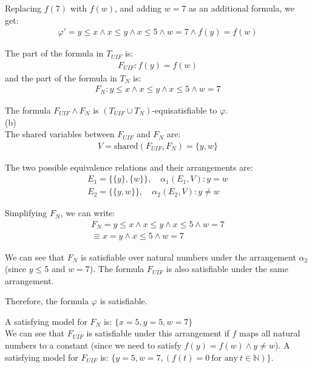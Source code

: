\documentclass[12pt,letterpaper, onecolumn]{exam}
\begin{document}
\begin{questions}
	Replacing $ f(7) $ with $ f(w) $, and adding $ w= 7 $ as an additional formula, we get:
	\begin{align*}
		\varphi' = y \le x \land x \le y \land x \le 5 \land w = 7 \land f(y) = f(w) 
	\end{align*} 

	The part of the formula in $ T_{UIF} $ is:
	\begin{align*}
		F_{UIF} : f(y) = f(w)
	\end{align*}
	and the part of the formula in $ T_{N} $ is:
	\begin{align*}
		F_{N} : y \le x \land x \le y \land x \le 5 \land w = 7
	\end{align*}

	The formula $ F_{UIF} \land F_{N} $ is $(T_{UIF} \cup T_N)$-equisatisfiable to $ \varphi $. \\

	(b) \\
	The shared variables between $ F_{UIF} $ and $ F_{N} $ are:
	\begin{align*}
		V = \text{shared}(F_{UIF}, F_{N}) = \{y, w\}
	\end{align*}

	The two possible equivalence relations and their arrangements are:
	\begin{align*}
		E_1 = \{\{y\}, \{w\}\}, \quad \alpha_1(E_1, V) : y = w\\
		E_2 = \{\{y, w\}\}, \quad \alpha_2(E_2, V) : y \neq w
	\end{align*}

	Simplifying $F_N$, we can write:
	\begin{align*}
		F_N = y \le x \land x \le y \land x \le 5 \land w = 7 \\
			\equiv x = y \land x \le 5 \land w = 7
	\end{align*}

	We can see that $F_N$ is satisfiable over natural numbers under the arrangement $\alpha_2$ (since $y \le 5$ and $w=7$).
	The formula $F_{UIF}$ is also satisfiable under the same arrangement.

	Therefore, the formula $ \varphi $ is satisfiable.

	A satisfying model for $F_N$ is:  $ \{x = 5, y = 5, w = 7\} $ \\

	We can see that $F_{UIF}$ is satisfiable under this arrangement if $f$ maps all natural numbers to a constant (since we need to satisfy
	$ f(y) = f(w) \land y \neq w $).
	A satisfying model for $F_{UIF}$ is: 
	$ \{y = 5, w = 7, (f(t) = 0 \: \text{for any} \: t \in \mathbb{N})\} $.  \\


\end{questions}
\end{document}
